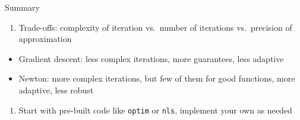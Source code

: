 \documentclass[8pt,ignorenonframetext,]{beamer}
\providecommand{\tightlist}{%
  \setlength{\itemsep}{0pt}\setlength{\parskip}{0pt}}
\begin{document}
\begin{frame}[fragile]{Summary}

\begin{enumerate}
\def\labelenumi{\arabic{enumi}.}
\tightlist
\item
  Trade-offs: complexity of iteration vs.~number of iterations
  vs.~precision of approximation
\end{enumerate}

\begin{itemize}
\tightlist
\item
  Gradient descent: less complex iterations, more guarantees, less
  adaptive
\item
  Newton: more complex iterations, but few of them for good functions,
  more adaptive, less robust
\end{itemize}

\begin{enumerate}
\def\labelenumi{\arabic{enumi}.}
\setcounter{enumi}{1}
\tightlist
\item
  Start with pre-built code like \texttt{optim} or \texttt{nls},
  implement your own as needed
\end{enumerate}

\end{frame}
\end{document}
